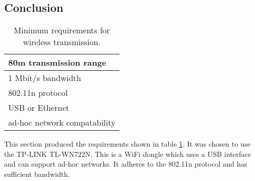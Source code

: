 \subsection{Conclusion} 
\begin{table}[H]
\centering
\caption{Minimum requirements for wireless transmission.}
\label{tab:req_wifi}
\begin{tabular}{|l|}
\hline
80m transmission range       \\ \hline
1 Mbit/s bandwidth                  \\ \hline
802.11n protocol             \\ \hline
USB or Ethernet              \\ \hline
ad-hoc network compatability \\ \hline
\end{tabular}
\end{table}
This section produced the requirements shown in table \ref{tab:req_wifi}.
It was chosen to use the TP-LINK TL-WN722N.
This is a WiFi dongle which uses a USB interface and can support ad-hoc networks.
It adheres to the 802.11n protocol and has sufficient bandwidth.